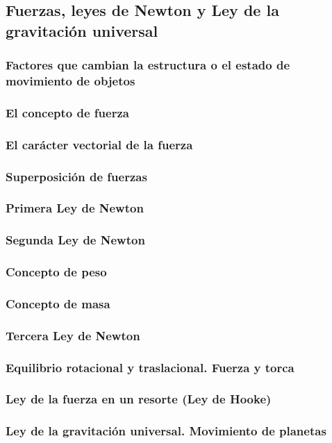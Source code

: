 \subsection{Fuerzas, leyes de Newton y Ley de la gravitación universal}
\subsubsection{Factores que cambian la estructura o el estado de movimiento de objetos}
\subsubsection{El concepto de fuerza}
\subsubsection{El carácter vectorial de la fuerza}
\subsubsection{Superposición de fuerzas}
\subsubsection{Primera Ley de Newton}
\subsubsection{Segunda Ley de Newton}
\subsubsection{Concepto de peso}
\subsubsection{Concepto de masa}
\subsubsection{Tercera Ley de Newton}
\subsubsection{Equilibrio rotacional y traslacional. Fuerza y torca}
\subsubsection{Ley de la fuerza en un resorte (Ley de Hooke)}
\subsubsection{Ley de la gravitación universal. Movimiento de planetas}
